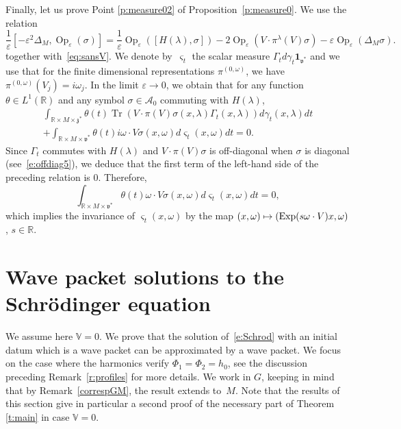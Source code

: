 \documentclass[10pt]{amsart}
\let\mathcal\mathscr
\newcommand\mto{\mathchoice{\longmapsto}{\mapsto}{\mapsto}{\mapsto}}
\newcommand{\bun}{\mathbf{1}}
\DeclareMathOperator{\Exp}{Exp}
\DeclareMathOperator{\Op}{Op}
\DeclareMathOperator{\Tr}{Tr}
\theoremstyle{plain}
\theoremstyle{definition}
\let\eps\varepsilon
\def\R{{\mathbb R}}
\def\bbV{{\mathbb V}}
\begin{document}
Finally, let us prove Point \eqref{p:measure02} of Proposition~\ref{p:measure0}. We use the relation
\begin{equation*}
\frac{1}{\eps}[-\eps^2\Delta_M,\Op_\eps(\sigma)]=\frac{1}{\eps}\Op_\eps([H(\lambda),\sigma])-2\Op_\eps(V\cdot \pi^\lambda(V)\sigma)-\eps\Op_\eps(\Delta_M\sigma).
\end{equation*}
together with~\eqref{eq:sansV}. We denote by~$\varsigma_t$ the scalar measure $\Gamma_t d\gamma_t\bun_{\mathfrak v^*}$ and we use that for the finite dimensional representations $\pi^{(0,\omega)}$, we have $\pi^{(0,\omega)}(V_j)=i\omega_j$. In the limit $\eps\to 0$, we obtain that for any function $\theta\in L^1(\R)$ and any symbol $\sigma\in \mathcal A_0$ commuting with $H(\lambda)$,
\begin{multline*}
\int_{\R\times M\times \mathfrak z^*} \theta(t)
\Tr(V\cdot \pi(V) \sigma(x,\lambda)\Gamma_t (x,\lambda)) d\gamma_t (x,\lambda)dt\\[-5pt]
+ \int_{\R\times M\times \mathfrak v^*}\theta(t)i \omega\cdot V\sigma(x,\omega) d\varsigma_t(x,\omega) dt=0.
\end{multline*}
Since $\Gamma_t$ commutes with $H(\lambda)$ and $V\cdot \pi(V)\sigma$ is off-diagonal when $\sigma$ is diagonal (see~\eqref{e:offdiag5}), we deduce that the first term of the left-hand side of the preceding relation is $0$. Therefore,
\[
\int_{\R\times M\times \mathfrak v^*} \theta(t)\omega\cdot V\sigma(x,\omega) d\varsigma_t(x,\omega) dt=0,
\]
which implies the invariance of $\varsigma_t(x,\omega)$ by the map $(x,\omega)\mto (\Exp(s\omega\cdot V) x,\omega)$, $s\in\R$.

\section{Wave packet solutions to the Schrödinger equation} \label{a:wpsolutions}

We assume here $\bbV=0$. We prove that the solution of~\eqref{e:Schrod} with an initial datum which is a wave packet can be approximated by a wave packet. We focus on the case where the harmonics verify $\Phi_1=\Phi_2=h_0$, see the discussion preceding Remark~\ref{r:profiles} for more details. We work in $G$, keeping in mind that by Remark~\ref{correspGM}, the result extends to~$M$. Note that the results of this section give in particular a second proof of the necessary part of Theorem \ref{t:main} in case $\bbV=0$.
\end{document}
